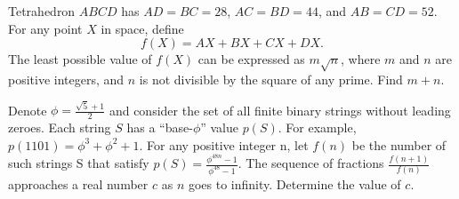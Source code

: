 \begin{question}[name={2017 AIME II, \href{https://artofproblemsolving.com/community/c4p7910363}{Problem 15}}]
	Tetrahedron $ABCD$ has $AD=BC=28$, $AC=BD=44$, and $AB=CD=52$. For any point $X$ in space, define $$f(X)=AX+BX+CX+DX.$$ The least possible value of $f(X)$ can be expressed as $m\sqrt{n}$, where $m$ and $n$ are positive integers, and $n$ is not divisible by the square of any prime. Find $m+n$.
\end{question}

%
%	
%	
%	
%
%







\begin{question}[name={2017 HMMT, November Team, \href{https://artofproblemsolving.com/community/c129h1640164p10330916}{Problem 10}}]
	Denote $\phi=\frac{\sqrt{5}+1}{2}$ and consider the set of all finite binary strings without leading zeroes. Each string $S$ has a “base-$\phi$” value $p(S)$. For example, $p(1101)=\phi^3+\phi^2+1$. For any positive integer n, let $f(n)$ be the number of such strings S that satisfy $p(S) =\frac{\phi^{48n}-1}{\phi^{48}-1}$. The sequence of fractions $\frac{f(n+1)}{f(n)}$ approaches a real number $c$ as $n$ goes to infinity. Determine the value of $c$.	
\end{question}




